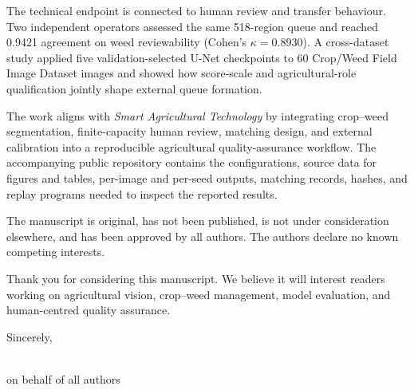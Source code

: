 \documentclass[11pt]{article}
\begin{document}
The technical endpoint is connected to human review and transfer behaviour. Two independent operators assessed the same 518-region queue and reached 0.9421 agreement on weed reviewability (Cohen's $\kappa=0.8930$). A cross-dataset study applied five validation-selected U-Net checkpoints to 60 Crop/Weed Field Image Dataset images and showed how score-scale and agricultural-role qualification jointly shape external queue formation.

The work aligns with \emph{Smart Agricultural Technology} by integrating crop--weed segmentation, finite-capacity human review, matching design, and external calibration into a reproducible agricultural quality-assurance workflow. The accompanying public repository contains the configurations, source data for figures and tables, per-image and per-seed outputs, matching records, hashes, and replay programs needed to inspect the reported results.

The manuscript is original, has not been published, is not under consideration elsewhere, and has been approved by all authors. The authors declare no known competing interests.

Thank you for considering this manuscript. We believe it will interest readers working on agricultural vision, crop--weed management, model evaluation, and human-centred quality assurance.

Sincerely,

\vspace{0.6em}
\begin{minipage}{0.55\textwidth}
\CorrespondingAuthor\\
on behalf of all authors
\end{minipage}
\end{document}
